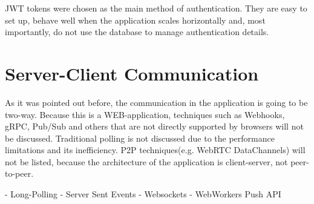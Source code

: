 JWT tokens were chosen as the main method of authentication. They are easy to set up, behave well when the
application scales horizontally and, most importantly, do not use the database to manage authentication details.


\section{Server-Client Communication}
As it was pointed out before, the communication in the application is going to be two-way.
Because this is a WEB-application, techniques such as Webhooks, gRPC, Pub/Sub and
others that are not directly supported by browsers will not be discussed. Traditional polling is not discussed due
to the performance limitations and its inefficiency. P2P techniques(e.g. WebRTC DataChannels) will not be listed,
because the architecture of the application is client-server, not peer-to-peer.

- Long-Polling
- Server Sent Events
- Websockets
- WebWorkers Push API
